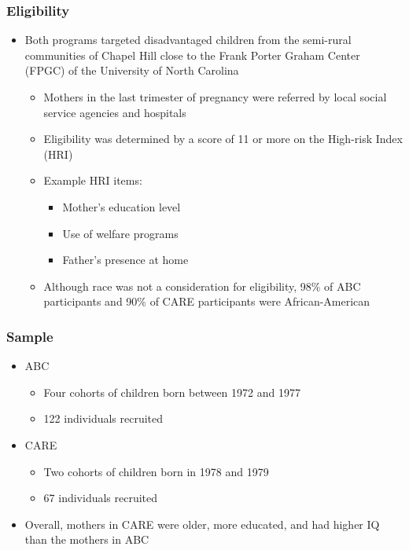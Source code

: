 \documentclass[static]{JJH-Beamer}
\begin{document}



\begin{frame}
\frametitle{Eligibility}
\begin{itemize}
	\item Both programs targeted disadvantaged children from the semi-rural communities of Chapel Hill close to the Frank Porter Graham Center (FPGC) of the University of North Carolina 
	\begin{itemize}
		\item Mothers in the last trimester of pregnancy were referred by local social service agencies and hospitals 		
		\item Eligibility was determined by a score of 11 or more on the High-risk Index (HRI)
		\item Example HRI items:
		\begin{itemize}
			\item Mother's education level
			\item Use of welfare programs
			\item Father's presence at home
		\end{itemize} 
		\item Although race was not a consideration for eligibility, 98\% of ABC participants and 90\% of CARE participants were African-American
	\end{itemize}
\end{itemize}
\end{frame}


\begin{frame}
\frametitle{Sample}
\label{sample}
\begin{itemize}
	\item ABC
	\begin{itemize}
		\item Four cohorts of children born between 1972 and 1977
		\item 122 individuals recruited
	\end{itemize}
	\item CARE
	\begin{itemize}
		\item Two cohorts of children born in 1978 and 1979
		\item 67 individuals recruited
	\end{itemize}
	\item Overall, mothers in CARE were older, more educated, and had higher IQ than the mothers in ABC
\end{itemize}
\hyperlink{baseline_abccare}{}
\end{frame}
\end{document}
